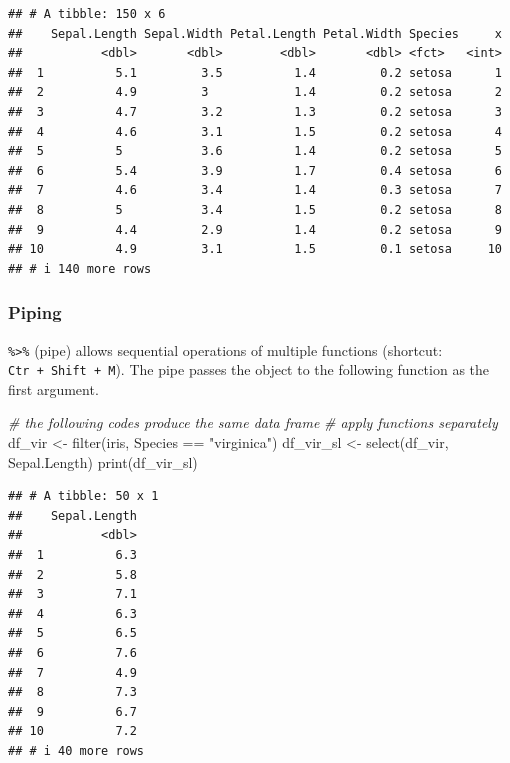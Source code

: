 \documentclass[
]{article}
\newenvironment{Shaded}{\begin{snugshade}}{\end{snugshade}}
\newcommand{\CommentTok}[1]{\textcolor[rgb]{0.56,0.35,0.01}{\textit{#1}}}
\newcommand{\FunctionTok}[1]{\textcolor[rgb]{0.00,0.00,0.00}{#1}}
\newcommand{\NormalTok}[1]{#1}
\newcommand{\OtherTok}[1]{\textcolor[rgb]{0.56,0.35,0.01}{#1}}
\newcommand{\SpecialCharTok}[1]{\textcolor[rgb]{0.00,0.00,0.00}{#1}}
\newcommand{\StringTok}[1]{\textcolor[rgb]{0.31,0.60,0.02}{#1}}
\begin{document}
\begin{verbatim}
## # A tibble: 150 x 6
##    Sepal.Length Sepal.Width Petal.Length Petal.Width Species     x
##           <dbl>       <dbl>        <dbl>       <dbl> <fct>   <int>
##  1          5.1         3.5          1.4         0.2 setosa      1
##  2          4.9         3            1.4         0.2 setosa      2
##  3          4.7         3.2          1.3         0.2 setosa      3
##  4          4.6         3.1          1.5         0.2 setosa      4
##  5          5           3.6          1.4         0.2 setosa      5
##  6          5.4         3.9          1.7         0.4 setosa      6
##  7          4.6         3.4          1.4         0.3 setosa      7
##  8          5           3.4          1.5         0.2 setosa      8
##  9          4.4         2.9          1.4         0.2 setosa      9
## 10          4.9         3.1          1.5         0.1 setosa     10
## # i 140 more rows
\end{verbatim}

\hypertarget{piping}{%
\subsubsection{Piping}\label{piping}}

\texttt{\%\textgreater{}\%} (pipe) allows sequential operations of multiple functions (shortcut: \texttt{Ctr\ +\ Shift\ +\ M}). The pipe passes the object to the following function as the first argument.

\begin{Shaded}
\begin{Highlighting}[]
\CommentTok{\# the following codes produce the same data frame}
\CommentTok{\# apply functions separately}
\NormalTok{df\_vir }\OtherTok{\textless{}{-}} \FunctionTok{filter}\NormalTok{(iris, Species }\SpecialCharTok{==} \StringTok{"virginica"}\NormalTok{)}
\NormalTok{df\_vir\_sl }\OtherTok{\textless{}{-}} \FunctionTok{select}\NormalTok{(df\_vir, Sepal.Length)}
\FunctionTok{print}\NormalTok{(df\_vir\_sl)}
\end{Highlighting}
\end{Shaded}

\begin{verbatim}
## # A tibble: 50 x 1
##    Sepal.Length
##           <dbl>
##  1          6.3
##  2          5.8
##  3          7.1
##  4          6.3
##  5          6.5
##  6          7.6
##  7          4.9
##  8          7.3
##  9          6.7
## 10          7.2
## # i 40 more rows
\end{verbatim}
\end{document}
